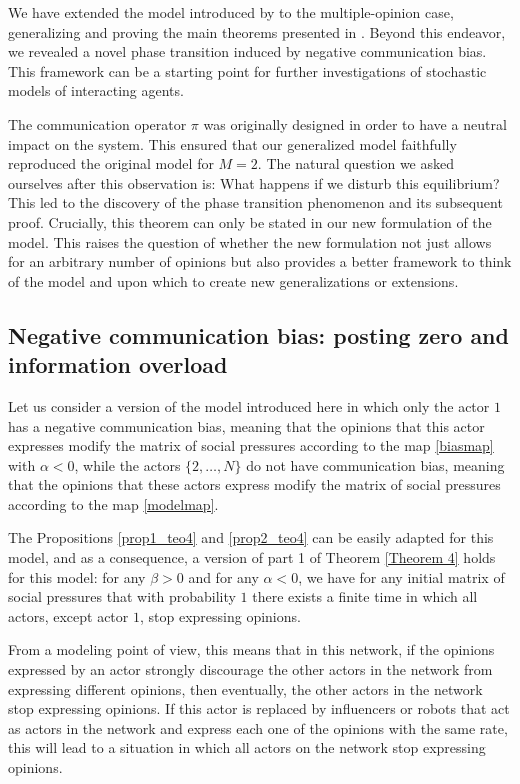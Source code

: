 \documentclass[11pt]{article}
\theoremstyle{definition}
\begin{document}
We have extended the model introduced by \cite{galves2024fastconsensusmetastabilityhighly} to the multiple-opinion case, generalizing and proving the main theorems presented in \cite{galves2024fastconsensusmetastabilityhighly}. Beyond this endeavor, we revealed a novel phase transition induced by negative communication bias. This framework can be a starting point for further investigations of stochastic models of interacting agents.

The communication operator $\pi$ was originally designed in order to have a neutral impact on the system. This ensured that our generalized model faithfully reproduced the original model for $M=2$. The natural question we asked ourselves after this observation is: What happens if we disturb this equilibrium? This led to the discovery of the phase transition phenomenon and its subsequent proof. Crucially, this theorem can only be stated in our new formulation of the model. This raises the question of whether the new formulation not just allows for an arbitrary number of opinions but also provides a better framework to think of the model and upon which to create new generalizations or extensions.


\subsection{Negative communication bias: posting zero and information overload}

Let us consider a version of the model introduced here in which only the actor $1$ has a negative communication bias, meaning that the opinions that this actor expresses modify the matrix of social pressures according to the map \eqref{biasmap} with $\alpha<0$, while the actors $\{2,\ldots, N\}$ do not have communication bias, meaning that the opinions that these actors express modify the matrix of social pressures according to the map \eqref{modelmap}.

The Propositions \ref{prop1_teo4} and \ref{prop2_teo4} can be easily adapted for this model, and as a consequence, a version of part 1 of Theorem \ref{Theorem 4} holds for this model: for any $\beta>0$ and for any $\alpha<0$, we have for any initial matrix of social pressures that with probability $1$ there exists a finite time in which all actors, except actor $1$, stop expressing opinions.

From a modeling point of view, this means that in this network, if the opinions expressed by an actor strongly discourage the other actors in the network from expressing different opinions, then eventually, the other actors in the network stop expressing opinions.
If this actor is replaced by influencers or robots that act as actors in the network and express each one of the opinions with the same rate, this will lead to a situation in which all actors on the network stop expressing opinions.
\end{document}
